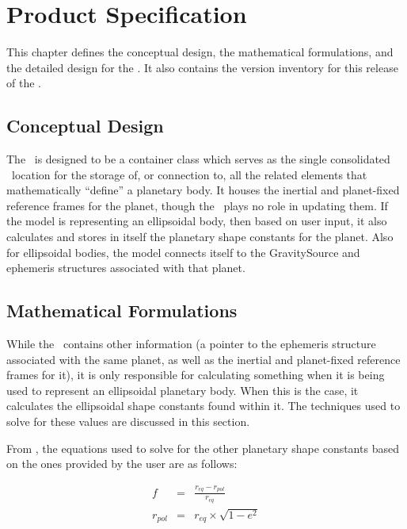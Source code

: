 \chapter{Product Specification}\label{ch:spec}

This chapter defines the conceptual design, the mathematical formulations, and
the detailed design for the \planetDesc.  It also contains the version inventory
for this release of the \planetDesc.

\section{Conceptual Design}

The \planetDesc\ is designed to be a container class which serves as the
single consolidated \JEODid\ location for the storage of, or connection
to, all the related elements that mathematically ``define'' a planetary body.
It houses the inertial and planet-fixed reference frames for the planet, though
the \planetDesc\ plays no role in updating them. If the model is representing
an ellipsoidal body, then based on user input, it also calculates and stores in
itself the planetary shape constants for the planet.  Also for ellipsoidal
bodies, the model connects itself to the GravitySource and ephemeris
structures associated with that planet.


\section{Mathematical Formulations}

While the \planetDesc\ contains other information (a pointer to the ephemeris
structure associated with the same planet, as well as the inertial and
planet-fixed reference frames for it), it is only responsible for calculating
something when it is being used to represent an ellipsoidal planetary body. When
this is the case, it calculates the ellipsoidal shape constants found within it.
The techniques used to solve for these values are discussed in this section.

From \cite{ValladoSecond}, the equations used to solve for the other
planetary shape constants based on the ones provided by the user are as follows:

\begin{eqnarray} \label{shape_const_convert}
f &=& \frac{r_{eq} - r_{pol}}{r_{eq}} \\
r_{pol} &=& r_{eq} \times \sqrt{1 - e^2}
\end{eqnarray}

